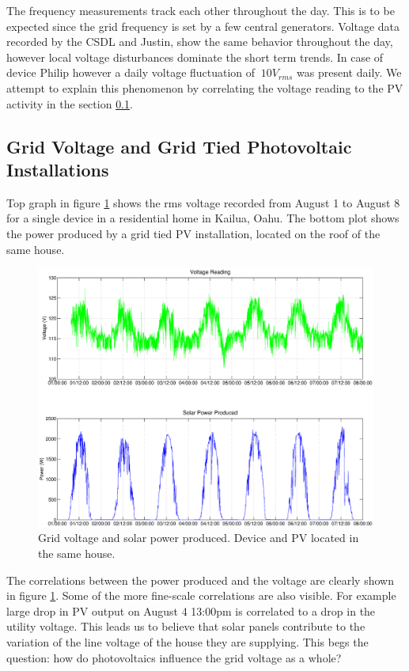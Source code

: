 The frequency measurements track each other throughout the day. This is to be expected since the grid frequency is set by a few central generators. Voltage data recorded by the CSDL and 
Justin, show the same behavior throughout the day, however local voltage disturbances dominate the short term trends. In case of device Philip however a daily voltage fluctuation of $~10V_{rms}$
was present daily. We attempt to explain this phenomenon by correlating the voltage reading to the PV activity in the section \ref{sub:PV}.
\subsection{Grid Voltage and Grid Tied Photovoltaic Installations}
\label{sub:PV}
Top graph in figure \ref{fig:samehouse} shows the rms voltage recorded from August 1 to August 8 for a single device in a residential home in Kailua, Oahu. The bottom plot shows the power produced by 
a grid tied PV installation, located on the roof of the same house.

\begin{figure}[h!]
\centering
\includegraphics[width=\textwidth]{img/solarCorelationSameHouse.eps}
\caption{Grid voltage and solar power produced. Device and PV located in the same house.}
\label{fig:samehouse}
\end{figure}

The correlations between the power produced and the voltage are clearly shown in figure  \ref{fig:samehouse}. Some of the more fine-scale correlations are also visible. 
For example large drop in PV output on August 4 13:00pm is correlated to a drop in the utility voltage. This leads us to believe that solar panels contribute to the
variation of the line voltage of the house they are supplying. This begs the question: how do photovoltaics influence the grid voltage as a whole?

